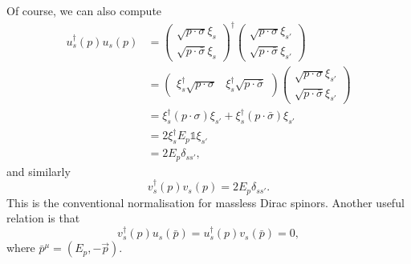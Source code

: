 \documentclass[11pt]{article}
\theoremstyle{definition}
\begin{document}
Of course, we can also compute
\begin{equation}
    \begin{aligned}
        u_s^\dagger(p)u_s(p) &= 
        \begin{pmatrix}
        \sqrt{p\cdot \sigma}\xi_s \\
        \sqrt{p\cdot \bar{\sigma}}\xi_s
    \end{pmatrix}^\dagger
        \begin{pmatrix}
        \sqrt{p\cdot \sigma}\xi_{s'} \\
        \sqrt{p\cdot \bar{\sigma}}\xi_{s'}
    \end{pmatrix}\\
    &= \begin{pmatrix}
        \xi_s^\dagger\sqrt{p\cdot \sigma} &
        \xi_s^\dagger\sqrt{p\cdot \bar{\sigma}}
    \end{pmatrix}
    \begin{pmatrix}
        \sqrt{p\cdot \sigma}\xi_{s'} \\
        \sqrt{p\cdot \bar{\sigma}}\xi_{s'}
    \end{pmatrix}\\
    &= \xi_s^\dagger (p\cdot \sigma) \xi_{s'} + \xi_s^\dagger (p\cdot \bar{\sigma}) \xi_{s'}\\
    &= 2\xi_s^\dagger E_p\mathds{1} \xi_{s'}\\
    &= 2E_p\delta_{ss'},
    \end{aligned}
\end{equation}
and similarly
\begin{equation}
    v_s^\dagger(p)v_s(p) = 2E_p\delta_{ss'}.
\end{equation}
This is the conventional normalisation for massless Dirac spinors. Another useful relation is that 
\begin{equation}
     v_s^\dagger(p)u_s(\bar{p}) = u_s^\dagger(p)v_s(\bar{p}) =0,
\end{equation}
where $\bar{p}^\mu = (E_p, -\vec{p})$.
\end{document}
